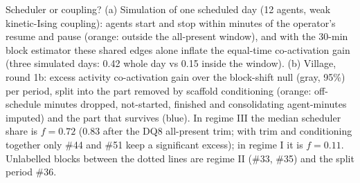 \caption{Scheduler or coupling? (a) Simulation of one scheduled day (12 agents, weak kinetic-Ising coupling): agents start and stop within minutes of the operator's resume and pause (orange: outside the all-present window), and with the 30-min block estimator these shared edges alone inflate the equal-time co-activation gain (three simulated days: 0.42 whole day vs 0.15 inside the window). (b) Village, round 1b: excess activity co-activation gain over the block-shift null (gray, 95\%) per period, split into the part removed by scaffold conditioning (orange: off-schedule minutes dropped, not-started, finished and consolidating agent-minutes imputed) and the part that survives (blue). In regime III the median scheduler share is $f=0.72$ (0.83 after the DQ8 all-present trim; with trim and conditioning together only \#44 and \#51 keep a significant excess); in regime I it is $f=0.11$. Unlabelled blocks between the dotted lines are regime II (\#33, \#35) and the split period \#36.}
\label{fig:H38}

